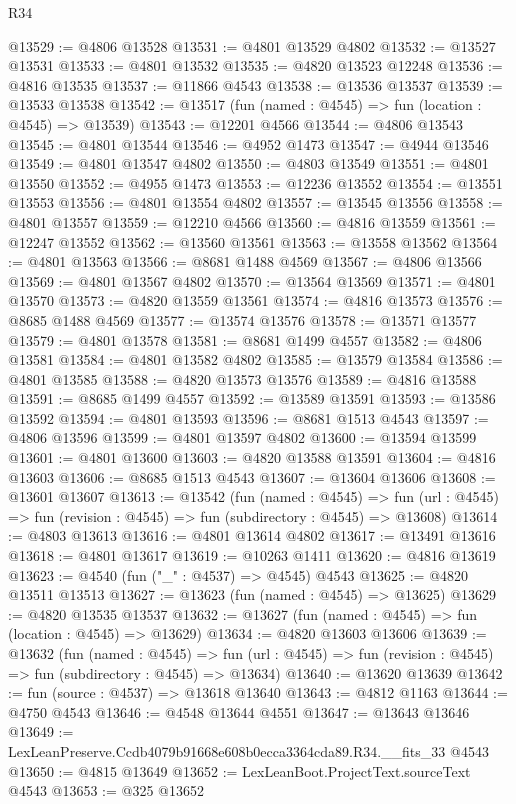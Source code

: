\begin{lexlean}{R34}
\begin{coremodule}
@13529 := @4806 @13528
@13531 := @4801 @13529 @4802
@13532 := @13527 @13531
@13533 := @4801 @13532
@13535 := @4820 @13523 @12248
@13536 := @4816 @13535
@13537 := @11866 @4543
@13538 := @13536 @13537
@13539 := @13533 @13538
@13542 := @13517 (fun (named : @4545) => fun (location : @4545) => @13539)
@13543 := @12201 @4566
@13544 := @4806 @13543
@13545 := @4801 @13544
@13546 := @4952 @1473
@13547 := @4944 @13546
@13549 := @4801 @13547 @4802
@13550 := @4803 @13549
@13551 := @4801 @13550
@13552 := @4955 @1473
@13553 := @12236 @13552
@13554 := @13551 @13553
@13556 := @4801 @13554 @4802
@13557 := @13545 @13556
@13558 := @4801 @13557
@13559 := @12210 @4566
@13560 := @4816 @13559
@13561 := @12247 @13552
@13562 := @13560 @13561
@13563 := @13558 @13562
@13564 := @4801 @13563
@13566 := @8681 @1488 @4569
@13567 := @4806 @13566
@13569 := @4801 @13567 @4802
@13570 := @13564 @13569
@13571 := @4801 @13570
@13573 := @4820 @13559 @13561
@13574 := @4816 @13573
@13576 := @8685 @1488 @4569
@13577 := @13574 @13576
@13578 := @13571 @13577
@13579 := @4801 @13578
@13581 := @8681 @1499 @4557
@13582 := @4806 @13581
@13584 := @4801 @13582 @4802
@13585 := @13579 @13584
@13586 := @4801 @13585
@13588 := @4820 @13573 @13576
@13589 := @4816 @13588
@13591 := @8685 @1499 @4557
@13592 := @13589 @13591
@13593 := @13586 @13592
@13594 := @4801 @13593
@13596 := @8681 @1513 @4543
@13597 := @4806 @13596
@13599 := @4801 @13597 @4802
@13600 := @13594 @13599
@13601 := @4801 @13600
@13603 := @4820 @13588 @13591
@13604 := @4816 @13603
@13606 := @8685 @1513 @4543
@13607 := @13604 @13606
@13608 := @13601 @13607
@13613 := @13542
    (fun (named : @4545) =>
    fun (url : @4545) => fun (revision : @4545) => fun (subdirectory : @4545) => @13608)
@13614 := @4803 @13613
@13616 := @4801 @13614 @4802
@13617 := @13491 @13616
@13618 := @4801 @13617
@13619 := @10263 @1411
@13620 := @4816 @13619
@13623 := @4540 (fun ("_" : @4537) => @4545) @4543
@13625 := @4820 @13511 @13513
@13627 := @13623 (fun (named : @4545) => @13625)
@13629 := @4820 @13535 @13537
@13632 := @13627 (fun (named : @4545) => fun (location : @4545) => @13629)
@13634 := @4820 @13603 @13606
@13639 := @13632
    (fun (named : @4545) =>
    fun (url : @4545) => fun (revision : @4545) => fun (subdirectory : @4545) => @13634)
@13640 := @13620 @13639
@13642 := fun (source : @4537) => @13618 @13640
@13643 := @4812 @1163
@13644 := @4750 @4543
@13646 := @4548 @13644 @4551
@13647 := @13643 @13646
@13649 := LexLeanPreserve.Ccdb4079b91668e608b0ecca3364cda89.R34.__fits_33 @4543
@13650 := @4815 @13649
@13652 := LexLeanBoot.ProjectText.sourceText @4543
@13653 := @325 @13652

\end{coremodule}
\end{lexlean}
